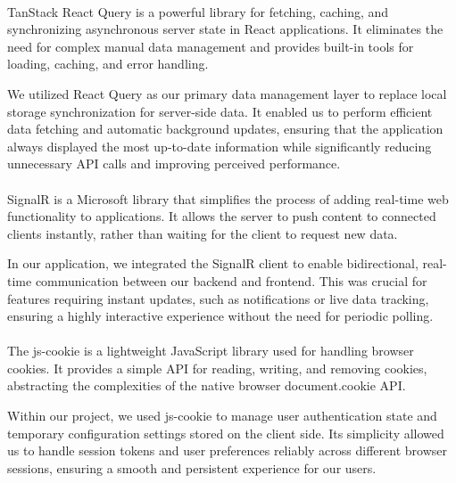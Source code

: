 \paragraph{}TanStack React Query is a powerful library\cite{reactquery} for fetching, caching, and synchronizing asynchronous server state in React applications. It eliminates the need for complex manual data management and provides built-in tools for loading, caching, and error handling.

We utilized React Query as our primary data management layer to replace local storage synchronization for server-side data. It enabled us to perform efficient data fetching and automatic background updates, ensuring that the application always displayed the most up-to-date information while significantly reducing unnecessary API calls and improving perceived performance.

\paragraph{}SignalR is a Microsoft library\cite{signalr} that simplifies the process of adding real-time web functionality to applications. It allows the server to push content to connected clients instantly, rather than waiting for the client to request new data.

In our application, we integrated the SignalR client to enable bidirectional, real-time communication between our backend and frontend. This was crucial for features requiring instant updates, such as notifications or live data tracking, ensuring a highly interactive experience without the need for periodic polling.

\paragraph{}The js-cookie is a lightweight JavaScript library\cite{jscookie} used for handling browser cookies. It provides a simple API for reading, writing, and removing cookies, abstracting the complexities of the native browser document.cookie API.

Within our project, we used js-cookie to manage user authentication state and temporary configuration settings stored on the client side. Its simplicity allowed us to handle session tokens and user preferences reliably across different browser sessions, ensuring a smooth and persistent experience for our users.

